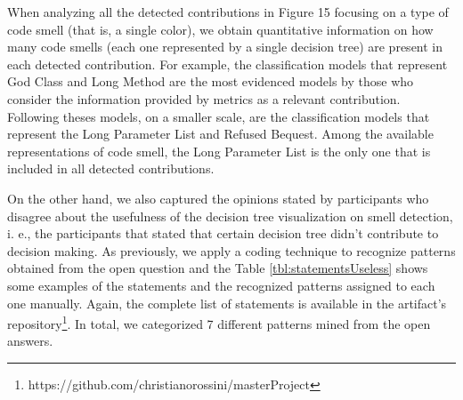 When analyzing all the detected contributions in Figure 15 focusing on a type of code smell (that is, a single color), we obtain quantitative information on how many code smells (each one represented by a single decision tree) are present in each detected contribution. For example, the classification models that represent God Class and Long Method are the most evidenced models by those who consider the information provided by metrics as a relevant contribution. Following theses models, on a smaller scale, are the classification models that represent the Long Parameter List and Refused Bequest. Among the available representations of code smell, the Long Parameter List is the only one that is included in all detected contributions.

On the other hand, we also captured the opinions stated by participants who disagree about the usefulness of the decision tree visualization on smell detection, i. e., the participants that stated that certain decision tree didn't contribute to decision making. As previously,  we apply a coding technique \cite{seaman1999qualitative} to recognize patterns obtained from the open question and the Table \ref{tbl:statementsUseless} shows some examples of the statements and the recognized patterns assigned to each one manually. Again, the complete list of statements is available in the artifact's repository\footnote{https://github.com/christianorossini/masterProject}. In total, we categorized 7 different patterns mined from the open answers. 

